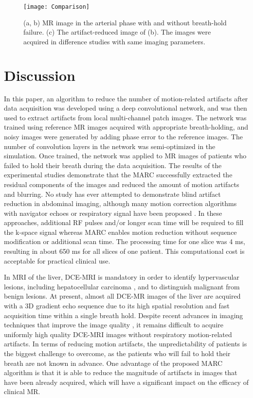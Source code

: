 \documentclass[num-refs]{wiley-article}
\begin{document}
\begin{figure}[bt]
\centering
\texttt{[image: Comparison]}
\caption{(a, b) MR image in the arterial phase with and without breath-hold failure. (c) The artifact-reduced image of (b). The images were acquired in difference studies with same imaging parameters.}
\label{fig_Comparison}
\end{figure}


\section{Discussion}

In this paper, an algorithm to reduce the number of motion-related artifacts after data acquisition was developed using a deep convolutional network, and was then used to extract artifacts from local multi-channel patch images. The network was trained using reference MR images acquired with appropriate breath-holding, and noisy images were generated by adding phase error to the reference images. The number of convolution layers in the network was semi-optimized in the simulation. Once trained, the network was applied to MR images of patients who failed to hold their breath during the data acquisition. The results of the experimental studies demonstrate that the MARC successfully extracted the residual components of the images and reduced the amount of motion artifacts and blurring. No study has ever attempted to demonstrate blind artifact reduction in abdominal imaging, although many motion correction algorithms with navigator echoes or respiratory signal have been proposed \cite{vasanawala2010navigated}\cite{brau2006generalized}\cite{cheng2012nonrigid}. In these approaches, additional RF pulses and/or longer scan time will be required to fill the k-space signal whereas MARC enables motion reduction without sequence modification or additional scan time. The processing time for one slice was 4 ms, resulting in about 650 ms for all slices of one patient. This computational cost is acceptable for practical clinical use.

In MRI of the liver, DCE-MRI is mandatory in order to identify hypervascular lesions, including hepatocellular carcinoma \cite{tang2017evidence}\cite{chen2016added}, and to distinguish malignant from benign lesions. At present, almost all DCE-MR images of the liver are acquired with a 3D gradient echo sequence due to its high spatial resolution and fast acquisition time within a single breath hold. Despite recent advances in imaging techniques that improve the image quality \cite{yang2016sparse}\cite{ogasawara2017image}, it remains difficult to acquire uniformly high quality DCE-MRI images without respiratory motion-related artifacts. In terms of reducing motion artifacts,  the unpredictability of patients is the biggest challenge to overcome, as the patients who will fail to hold their breath are not known in advance. One advantage of the proposed MARC algorithm is that it is able to reduce the magnitude of artifacts in images that have been already acquired, which will have a significant impact on the efficacy of clinical MR.
\end{document}
